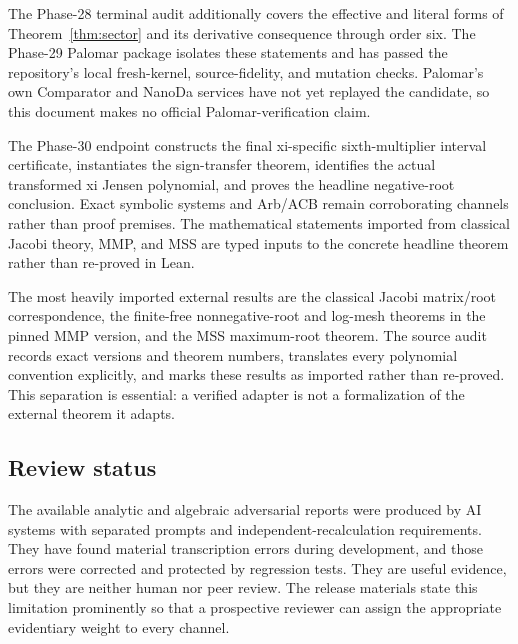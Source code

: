 The Phase-28 terminal audit additionally covers the effective and literal
forms of Theorem~\ref{thm:sector} and its derivative consequence through
order six.  The Phase-29 Palomar package isolates these statements and has
passed the repository's local fresh-kernel, source-fidelity, and mutation
checks.  Palomar's own Comparator and NanoDa services have not yet replayed
the candidate, so this document makes no official Palomar-verification
claim.

The Phase-30 endpoint constructs the final xi-specific sixth-multiplier
interval certificate, instantiates the sign-transfer theorem, identifies the
actual transformed xi Jensen polynomial, and proves the headline
negative-root conclusion.  Exact symbolic systems and Arb/ACB remain
corroborating channels rather than proof premises.  The mathematical
statements imported from classical Jacobi theory, MMP, and MSS are typed
inputs to the concrete headline theorem rather than re-proved in Lean.

The most heavily imported external results are the classical Jacobi
matrix/root correspondence, the finite-free nonnegative-root and log-mesh
theorems in the pinned MMP version, and the MSS maximum-root theorem.  The
source audit records exact versions and theorem numbers, translates every
polynomial convention explicitly, and marks these results as imported rather
than re-proved.  This separation is essential: a verified adapter is not a
formalization of the external theorem it adapts.

\subsection{Review status}

The available analytic and algebraic adversarial reports were produced by
AI systems with separated prompts and independent-recalculation requirements.
They have found material transcription errors during development, and those
errors were corrected and protected by regression tests.  They are useful
evidence, but they are neither human nor peer review.  The release materials
state this limitation prominently so that a prospective reviewer can assign
the appropriate evidentiary weight to every channel.
